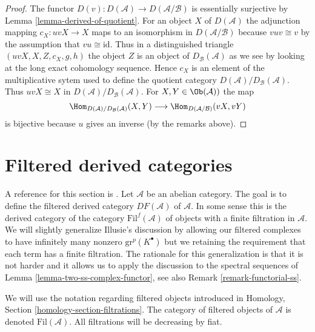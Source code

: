 \begin{proof}
The functor $D(v) : D(\mathcal{A}) \to D(\mathcal{A}/\mathcal{B})$
is essentially surjective by
Lemma \ref{lemma-derived-of-quotient}.
For an object $X$ of $D(\mathcal{A})$ the adjunction mapping
$c_X : uvX \to X$ maps to an isomorphism in $D(\mathcal{A}/\mathcal{B})$
because $vuv \cong v$ by the assumption that $vu \cong \text{id}$.
Thus in a distinguished triangle $(uvX, X, Z, c_X, g, h)$ the object
$Z$ is an object of $D_\mathcal{B}(\mathcal{A})$ as we see by looking
at the long exact cohomology sequence.
Hence $c_X$ is an element of the multiplicative sytem used to define
the quotient category $D(\mathcal{A})/D_\mathcal{B}(\mathcal{A})$.
Thus $uvX \cong X$ in $D(\mathcal{A})/D_\mathcal{B}(\mathcal{A})$.
For $X, Y \in \Ob(\mathcal{A}))$ the map
$$
\Hom_{D(\mathcal{A})/D_\mathcal{B}(\mathcal{A})}(X, Y)
\longrightarrow
\Hom_{D(\mathcal{A}/\mathcal{B})}(vX, vY)
$$
is bijective because $u$ gives an inverse (by the remarks above).
\end{proof}









\section{Filtered derived categories}
\label{section-filtered-derived-category}

\noindent
A reference for this section is \cite[I, Chapter V]{cotangent}.
Let $\mathcal{A}$ be an abelian category.
The goal is to define the filtered derived category $DF(\mathcal{A})$
of $\mathcal{A}$. In some sense this is the derived category
of the category $\text{Fil}^f(\mathcal{A})$
of objects with a finite filtration in $\mathcal{A}$.
We will slightly generalize Illusie's discussion by allowing our
filtered complexes to have infinitely many nonzero $\text{gr}^p(K^\bullet)$
but we retaining the requirement that each term has a finite filtration.
The rationale for this generalization is that it is not
harder and it allows us to apply the discussion to the spectral sequences of
Lemma \ref{lemma-two-ss-complex-functor}, see also
Remark \ref{remark-functorial-ss}.

\medskip\noindent
We will use the notation regarding filtered objects introduced in
Homology, Section \ref{homology-section-filtrations}.
The category of filtered objects of $\mathcal{A}$ is
denoted $\text{Fil}(\mathcal{A})$.
All filtrations will be decreasing by fiat.

